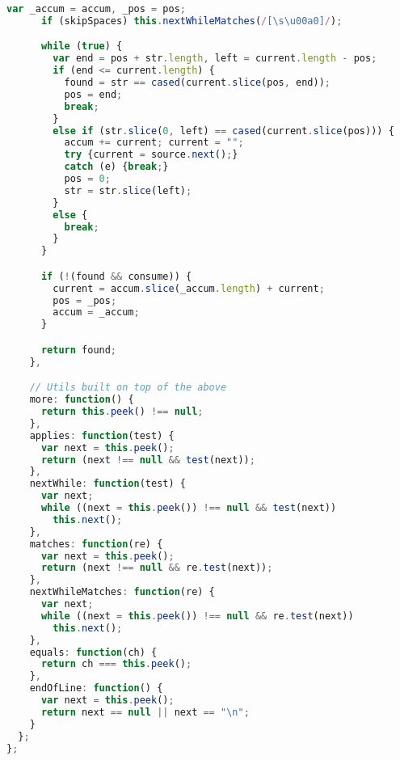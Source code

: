 \begin{lstlisting}[language=Javascript]
      var _accum = accum, _pos = pos;
      if (skipSpaces) this.nextWhileMatches(/[\s\u00a0]/);

      while (true) {
        var end = pos + str.length, left = current.length - pos;
        if (end <= current.length) {
          found = str == cased(current.slice(pos, end));
          pos = end;
          break;
        }
        else if (str.slice(0, left) == cased(current.slice(pos))) {
          accum += current; current = "";
          try {current = source.next();}
          catch (e) {break;}
          pos = 0;
          str = str.slice(left);
        }
        else {
          break;
        }
      }

      if (!(found && consume)) {
        current = accum.slice(_accum.length) + current;
        pos = _pos;
        accum = _accum;
      }

      return found;
    },

    // Utils built on top of the above
    more: function() {
      return this.peek() !== null;
    },
    applies: function(test) {
      var next = this.peek();
      return (next !== null && test(next));
    },
    nextWhile: function(test) {
      var next;
      while ((next = this.peek()) !== null && test(next))
        this.next();
    },
    matches: function(re) {
      var next = this.peek();
      return (next !== null && re.test(next));
    },
    nextWhileMatches: function(re) {
      var next;
      while ((next = this.peek()) !== null && re.test(next))
        this.next();
    },
    equals: function(ch) {
      return ch === this.peek();
    },
    endOfLine: function() {
      var next = this.peek();
      return next == null || next == "\n";
    }
  };
};
\end{lstlisting}

